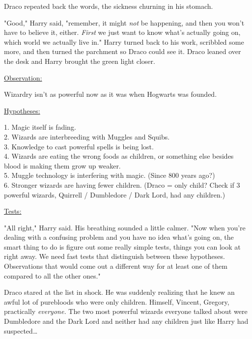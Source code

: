 Draco repeated back the words, the sickness churning in his stomach.

"Good," Harry said, "remember, it might \emph{not} be happening, and then you 
won't have to believe it, either. \emph{First} we just want to know what's 
actually going on, which world we actually live in." Harry turned back to his 
work, scribbled some more, and then turned the parchment so Draco could see it. 
Draco leaned over the desk and Harry brought the green light closer.

\begin{writtenNote}
\underline{Observation:}

Wizardry isn't as powerful now as it was when Hogwarts was founded.

\underline{Hypotheses:}

\noindent{}1. Magic itself is fading.\\
2. Wizards are interbreeding with Muggles and Squibs.\\
3. Knowledge to cast powerful spells is being lost.\\
4. Wizards are eating the wrong foods as children, or something else besides 
blood is making them grow up weaker.\\
5. Muggle technology is interfering with magic. (Since 800 years ago?)\\
6. Stronger wizards are having fewer children. (Draco = only child? Check if 3 
powerful wizards, Quirrell / Dumbledore / Dark Lord, had any children.)

\underline{Tests:}
\end{writtenNote}

"All right," Harry said. His breathing sounded a little calmer. "Now when 
you're dealing with a confusing problem and you have no idea what's going on, 
the smart thing to do is figure out some really simple tests, things you can 
look at right away. We need fast tests that distinguish between these 
hypotheses. Observations that would come out a different way for at least one 
of them compared to all the other ones."

Draco stared at the list in shock. He was suddenly realizing that he knew an 
awful lot of purebloods who were only children. Himself, Vincent, Gregory, 
practically \emph{everyone.} The two most powerful wizards everyone talked 
about were Dumbledore and the Dark Lord and neither had any children just like 
Harry had suspected{\ldots}

